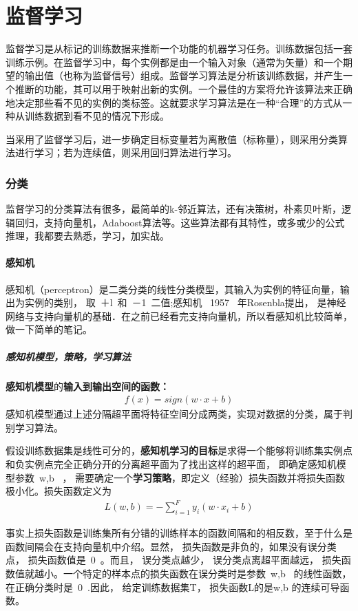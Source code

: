 \part{监督学习}
监督学习是从标记的训练数据来推断一个功能的机器学习任务。训练数据包括一套训练示例。在监督学习中，每个实例都是由一个输入对象（通常为矢量）和一个期望的输出值（也称为监督信号）组成。监督学习算法是分析该训练数据，并产生一个推断的功能，其可以用于映射出新的实例。一个最佳的方案将允许该算法来正确地决定那些看不见的实例的类标签。这就要求学习算法是在一种“合理”的方式从一种从训练数据到看不见的情况下形成。

当采用了监督学习后，进一步确定目标变量若为离散值（标称量），则采用分类算法进行学习；若为连续值，则采用回归算法进行学习。

\section{分类}
监督学习的分类算法有很多，最简单的k-邻近算法，还有决策树，朴素贝叶斯，逻辑回归，支持向量机，Adaboost算法等。这些算法都有其特性，或多或少的公式推理，我都要去熟悉，学习，加实战。
\subsection{感知机}
感知机（perceptron）是二类分类的线性分类模型，其输入为实例的特征向量，输出为实例的类别， 取~＋l~和~－1~二值;感知机 ~1957 ~年Rosenbla提出， 是神经网络与支持向量机的基础．在之前已经看完支持向量机，所以看感知机比较简单，做一下简单的笔记。
\subsubsection{感知机模型，策略，学习算法}
\textbf{感知机模型}的\textbf{输入到输出空间的函数：}
\begin{align}
f(x) = sign (w\cdot x+b)  \nonumber
\end{align}
感知机模型通过上述分隔超平面将特征空间分成两类，实现对数据的分类，属于判别学习算法。

假设训练数据集是线性可分的，\textbf{感知机学习的目标}是求得一个能够将训练集实例点和负实例点完全正确分开的分离超平面为了找出这样的超平面， 即确定感知机模型参数~w,b~ ， 需要确定一个\textbf{学习策略}，即定义（经验）损失函数并将损失函数极小化。损失函数定义为
\begin{align}
L(w,b)=-\sum_{i=1}^{F}y_i(w\cdot x_i+b)  \nonumber
\end{align}

事实上损失函数是训练集所有分错的训练样本的函数间隔和的相反数，至于什么是函数间隔会在支持向量机中介绍。显然， 损失函数是非负的，如果没有误分类点， 损失函数值是~0~。而且， 误分类点越少， 误分类点离超平面越远， 损失函数值就越小。一个特定的样本点的损失函数在误分类时是参数~w,b~ 的线性函数， 在正确分类时是~0~.因此， 给定训练数据集T， 损失函数L的是w,b 的连续可导函数。

